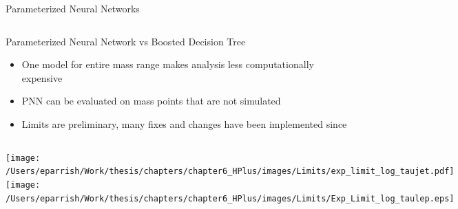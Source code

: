 \documentclass[aspectratio=169,xcolor=table]{beamer}
\begin{document}
\begin{frame}[t]{Parameterized Neural Networks}
\begin{columns}
        \begin{table}
        \end{table}
      \end{columns}
    \end{frame}

    \begin{frame}[t]{Parameterized Neural Network vs Boosted Decision Tree}
      \begin{itemize}
        \item One model for entire mass range makes analysis less computationally expensive
        \item PNN can be evaluated on mass points that are not simulated
        \item Limits are preliminary, many fixes and changes have been implemented since
      \end{itemize}
      \begin{columns}
      \centering
      \texttt{[image: /Users/eparrish/Work/thesis/chapters/chapter6\_HPlus/images/Limits/exp\_limit\_log\_taujet.pdf]}
      \centering
      \texttt{[image: /Users/eparrish/Work/thesis/chapters/chapter6\_HPlus/images/Limits/Exp\_Limit\_log\_taulep.eps]}
      \end{columns}
    \end{frame}
\end{document}
